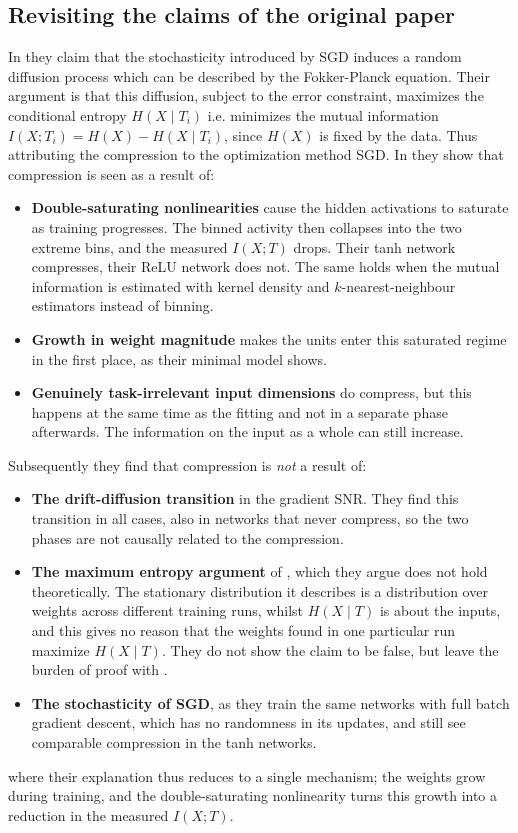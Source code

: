 \subsection{Revisiting the claims of the original paper}
In \cite{shwartzziv2017} they claim that the stochasticity introduced by SGD
induces a random diffusion process which can be described by the Fokker-Planck
equation. Their argument is that this diffusion, subject to the error
constraint, maximizes the conditional entropy $H(X\mid T_i)$ i.e. minimizes the
mutual information $I(X;T_i)=H(X)-H(X\mid T_i)$, since $H(X)$ is fixed by the
data. Thus attributing the compression to the optimization method SGD. In
\cite{saxe2018} they show that compression is seen as a result of:
\begin{itemize}
	\item \textbf{Double-saturating nonlinearities} cause the hidden activations
	to saturate as training progresses. The binned activity then collapses into
	the two extreme bins, and the measured $I(X;T)$ drops. Their tanh network
	compresses, their ReLU network does not. The same holds when the mutual
	information is estimated with kernel density and $k$-nearest-neighbour
	estimators instead of binning.
	\item \textbf{Growth in weight magnitude} makes the units enter this
	saturated regime in the first place, as their minimal model shows.
	\item \textbf{Genuinely task-irrelevant input dimensions} do compress, but
	this happens at the same time as the fitting and not in a separate phase
	afterwards. The information on the input as a whole can still increase.
\end{itemize}

Subsequently they find that compression is \textit{not} a result of:
\begin{itemize}
	\item \textbf{The drift-diffusion transition} in the gradient SNR. They find
	this transition in all cases, also in networks that never compress, so the
	two phases are not causally related to the compression.
	\item \textbf{The maximum entropy argument} of \cite{shwartzziv2017}, which
	they argue does not hold theoretically. The stationary distribution it
	describes is a distribution over weights across different training runs,
	whilst $H(X\mid T)$ is about the inputs, and this gives no reason that the
	weights found in one particular run maximize $H(X\mid T)$. They do not show
	the claim to be false, but leave the burden of proof with
	\cite{shwartzziv2017}.
	\item \textbf{The stochasticity of SGD}, as they train the same networks
	with full batch gradient descent, which has no randomness in its updates,
	and still see comparable compression in the tanh networks.
\end{itemize}
where their explanation thus reduces to a single mechanism; the weights grow
during training, and the double-saturating nonlinearity turns this growth into
a reduction in the measured $I(X;T)$.
